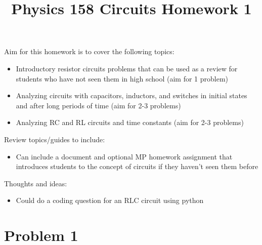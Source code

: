 \documentclass[11pt, fleqn]{article}
\title{Physics 158 Circuits Homework 1}
\author{}
\date{}
\begin{document}
\allowdisplaybreaks

\maketitle

Aim for this homework is to cover the following topics:
\begin{itemize}
    \item Introductory resistor circuits problems that can be used as a review for students who have not seen them in high school (aim for 1 problem)
    \item Analyzing circuits with capacitors, inductors, and switches in initial states and after long periods of time (aim for 2-3 problems)
    \item Analyzing RC and RL circuits and time constants (aim for 2-3 problems)
\end{itemize}

Review topics/guides to include:
\begin{itemize}
    \item Can include a document and optional MP homework assignment that introduces students to the concept of circuits if they haven't seen them before
\end{itemize}

Thoughts and ideas:
\begin{itemize}
    \item Could do a coding question for an RLC circuit using python
\end{itemize}

\section*{Problem 1}
\end{document}
